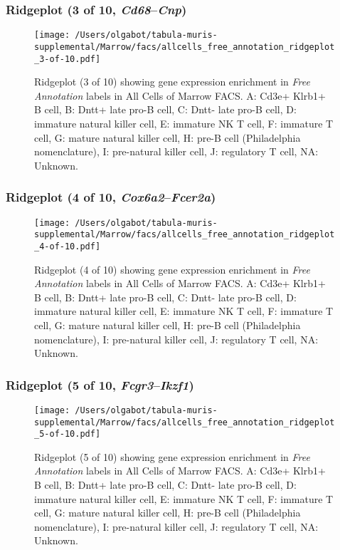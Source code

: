\clearpage

\subsubsection{Ridgeplot (3 of 10, \emph{Cd68}--\emph{Cnp})}
\begin{figure}[h]
\centering
\texttt{[image: /Users/olgabot/tabula-muris-supplemental/Marrow/facs/allcells\_free\_annotation\_ridgeplot\_3-of-10.pdf]}

\caption{ Ridgeplot (3 of 10)  showing gene expression enrichment in \emph{Free Annotation} labels in All Cells of Marrow FACS. A: Cd3e+ Klrb1+ B cell, B: Dntt+ late pro-B cell, C: Dntt- late pro-B cell, D: immature natural killer cell, E: immature NK T cell, F: immature T cell, G: mature natural killer cell, H: pre-B cell (Philadelphia nomenclature), I: pre-natural killer cell, J: regulatory T cell, NA: Unknown.}
\end{figure}


\clearpage

\subsubsection{Ridgeplot (4 of 10, \emph{Cox6a2}--\emph{Fcer2a})}
\begin{figure}[h]
\centering
\texttt{[image: /Users/olgabot/tabula-muris-supplemental/Marrow/facs/allcells\_free\_annotation\_ridgeplot\_4-of-10.pdf]}

\caption{ Ridgeplot (4 of 10)  showing gene expression enrichment in \emph{Free Annotation} labels in All Cells of Marrow FACS. A: Cd3e+ Klrb1+ B cell, B: Dntt+ late pro-B cell, C: Dntt- late pro-B cell, D: immature natural killer cell, E: immature NK T cell, F: immature T cell, G: mature natural killer cell, H: pre-B cell (Philadelphia nomenclature), I: pre-natural killer cell, J: regulatory T cell, NA: Unknown.}
\end{figure}


\clearpage

\subsubsection{Ridgeplot (5 of 10, \emph{Fcgr3}--\emph{Ikzf1})}
\begin{figure}[h]
\centering
\texttt{[image: /Users/olgabot/tabula-muris-supplemental/Marrow/facs/allcells\_free\_annotation\_ridgeplot\_5-of-10.pdf]}

\caption{ Ridgeplot (5 of 10)  showing gene expression enrichment in \emph{Free Annotation} labels in All Cells of Marrow FACS. A: Cd3e+ Klrb1+ B cell, B: Dntt+ late pro-B cell, C: Dntt- late pro-B cell, D: immature natural killer cell, E: immature NK T cell, F: immature T cell, G: mature natural killer cell, H: pre-B cell (Philadelphia nomenclature), I: pre-natural killer cell, J: regulatory T cell, NA: Unknown.}
\end{figure}


